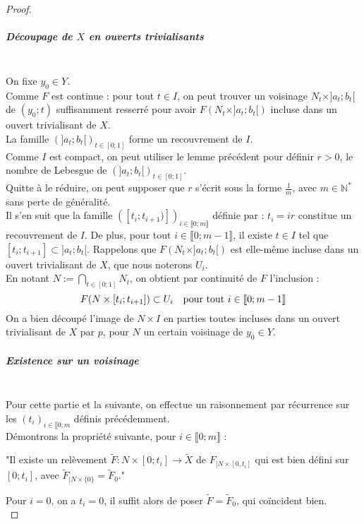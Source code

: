 \begin{proof}
			\subparagraph{Découpage de $X$ en ouverts trivialisants}~\\
				On fixe $y_{0}\in Y$.\\
				Comme $F$ est continue : pour tout $t\in I$, on peut trouver un voisinage $N_{t}\times ]a_{t};b_{t}[$ de 
				$(y_{0};t)$ suffisamment resserré pour avoir $F(N_{t}\times ]a_{t};b_{t}[)$ incluse dans un ouvert trivialisant de 
				$X$.\\
				La famille $(]a_{t};b_{t}[)_{t\in[0;1]}$ forme un recouvrement de $I$.\\
				Comme $I$ est compact, on peut utiliser le lemme précédent pour définir $r>0$, le nombre de Lebesgue de 
				$(]a_{t};b_{t}[)_{t\in[0;1]}$.\\
				Quitte à le réduire, on peut supposer que $r$ s'écrit sous la forme $\frac{1}{m}$, avec $m\in\mathbb{N}^{*}$ 
				sans perte de généralité. \\
				Il s'en suit que la famille $([t_{i};t_{i+1})])_{i\in\llbracket0;m\rrbracket}$ définie par : $t_{i} = ir$ 
				constitue un recouvrement de $I$. De plus, pour tout $i\in\llbracket0;m-1\rrbracket$, il existe $t\in I$ 
				tel que $[t_{i};t_{i+1}]\subset ]a_{t};b_{t}[$. Rappelons que $F(N_{t}\times ]a_{t};b_{t}[)$ est elle-même 
				incluse dans un ouvert trivialisant de $X$, que nous noterons $U_{i}$.\\
				En notant $N := \bigcap\limits_{t\in[0;1]} N_{t}$, on obtient par continuité de $F$ l'inclusion : 
				\[F(N\times [t_{i};t_{i+1}])\subset U_{i} \text{\quad pour tout $i\in\llbracket0;m-1\rrbracket$}\]
				On a bien découpé l'image de $N\times I$ en parties toutes incluses dans un ouvert trivialisant de $X$ par $p$, 
				pour $N$ un certain voisinage de $y_{0}\in Y$.
\pagebreak
			\subparagraph{Existence sur un voisinage}~\\
				Pour cette partie et la suivante, on effectue un raisonnement par récurrence sur les 
				$(t_{i})_{i\in\llbracket{0;m}}$ définis précédemment.\\
				Démontrons la propriété suivante, pour $i\in\llbracket0;m\rrbracket$ :
				\begin{center}
					"Il existe un relèvement $\tilde{F} : N\times [0;t_{i}] \longrightarrow \tilde{X}$ de $F_{|N\times [0,t_{i}]}$ 
					qui est bien défini sur $[0;t_{i}]$, avec $\tilde{F}_{|N\times \{0\}}= \tilde{F}_{0}$."
				\end{center}
				Pour $i=0$, on a $t_{i}=0$, il suffit alors de poser $\tilde{F} = \tilde{F}_{0}$, qui coïncident bien.\\

\end{proof}
